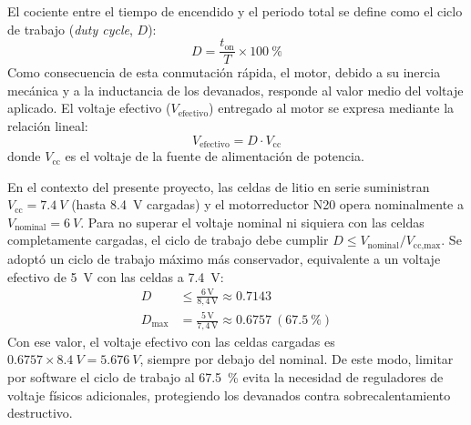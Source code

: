 \documentclass[conference]{IEEEtran}
\newcommand{\valDutyFullCharge}{0.7143}
\newcommand{\valDutyAdopted}{0.6757}
\newcommand{\valEffectiveAtFull}{5.676}
\begin{document}
El cociente entre el tiempo de encendido y el periodo total se define como el ciclo de trabajo (\emph{duty cycle}, $D$):
\begin{equation}
D = \frac{t_{\text{on}}}{T} \times \SI{100}{\percent}
\end{equation}
Como consecuencia de esta conmutación rápida, el motor, debido a su inercia mecánica y a la inductancia de los devanados, responde al valor medio del voltaje aplicado. El voltaje efectivo ($V_{\text{efectivo}}$) entregado al motor se expresa mediante la relación lineal:
\begin{equation}
V_{\text{efectivo}} = D \cdot V_{\text{cc}}
\end{equation}
donde $V_{\text{cc}}$ es el voltaje de la fuente de alimentación de potencia.

En el contexto del presente proyecto, las celdas de litio en serie suministran $V_{\text{cc}} = \SI{7.4}{V}$ (hasta \SI{8.4}{V} cargadas) y el motorreductor N20 opera nominalmente a $V_{\text{nominal}} = \SI{6}{V}$. Para no superar el voltaje nominal ni siquiera con las celdas completamente cargadas, el ciclo de trabajo debe cumplir $D \le V_{\text{nominal}}/V_{\text{cc,max}}$. Se adoptó un ciclo de trabajo máximo más conservador, equivalente a un voltaje efectivo de \SI{5}{V} con las celdas a \SI{7.4}{V}:
\begin{equation}
\begin{aligned}
D &\le \frac{6\,\text{V}}{8{,}4\,\text{V}} \approx \num{\valDutyFullCharge} \\
D_{\max} &= \frac{5\,\text{V}}{7{,}4\,\text{V}} \approx \num{\valDutyAdopted}\ (\SI{67.5}{\percent})
\end{aligned}
\end{equation}
Con ese valor, el voltaje efectivo con las celdas cargadas es $\num{\valDutyAdopted}\times\SI{8.4}{V} = \SI{\valEffectiveAtFull}{V}$, siempre por debajo del nominal. De este modo, limitar por software el ciclo de trabajo al \SI{67.5}{\percent} evita la necesidad de reguladores de voltaje físicos adicionales, protegiendo los devanados contra sobrecalentamiento destructivo.
\end{document}
